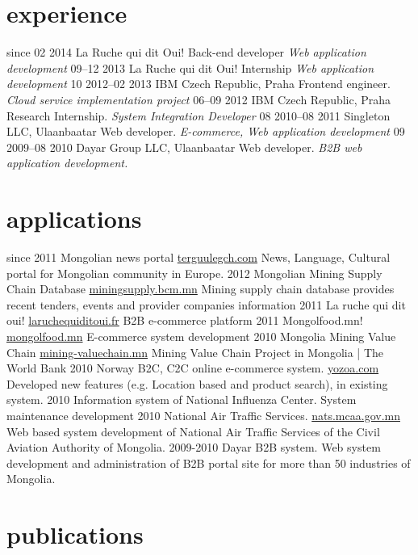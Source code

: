 \documentclass[backend=biber, print]{friggeri-cv}
\begin{document}
\section{experience}

\begin{entrylist}
  \entry
    {since 02 2014}
    {La Ruche qui dit Oui!}
    {Back-end developer}
    {\emph{Web application development}}
  \entry
    {09–12 2013}
    {La Ruche qui dit Oui!}
    {Internship}
    {\emph{Web application development}}
  \entry
    {10 2012–02 2013}
    {IBM Czech Republic, Praha}
    {Frontend engineer.}
    {\emph{Cloud service implementation project}}
  \entry
    {06–09 2012}
    {IBM Czech Republic, Praha}
    {Research Internship.}
    {\emph{System Integration Developer}}
  \entry
    {08 2010–08 2011}
    {Singleton LLC, Ulaanbaatar}
    {Web developer.}
    {\emph{E-commerce, Web application development}}
  \entry
    {09 2009–08 2010}
    {Dayar Group LLC, Ulaanbaatar}
    {Web developer.}
    {\emph{B2B web application development.}}
\end{entrylist}

\section{applications}

\begin{entrylist}
  \entry
    {since 2011}
    {Mongolian news portal}
    {\href{http://terguulegch.com}{terguulegch.com}}
    {News, Language, Cultural portal for Mongolian community in Europe.}
  \entry
    {2012}
    {Mongolian Mining Supply Chain Database}
    {\href{http://miningsupply.bcm.mn}{miningsupply.bcm.mn}}
    {Mining supply chain database provides recent tenders, events and provider companies information }
  \entry
    {2011}
    {La ruche qui dit oui!}
    {\href{http://www.laruchequiditoui.fr}{laruchequiditoui.fr}}
    {B2B e-commerce platform}
  \entry
    {2011}
    {Mongolfood.mn!}
    {\href{http://mongolfood.mn/}{mongolfood.mn}}
    {E-commerce system development}
  \entry
    {2010}
    {Mongolia Mining Value Chain}
    {\href{http://mining-valuechain.eri.mn}{mining-valuechain.mn}}
    {Mining Value Chain Project in Mongolia | The World Bank}
  \entry
    {2010}
    {Norway B2C, C2C online e-commerce system.}
    {\href{http://dev.yozoa.com}{yozoa.com}}
    {Developed new features (e.g. Location based and product search),  in existing system.}
  \entry
    {2010}
    {Information system of National Influenza Center.}
    {}
    {System maintenance development}
  \entry
    {2010}
    {National Air Traffic Services.}
    {\href{http://nats.mcaa.gov.mn/}{nats.mcaa.gov.mn}}
    {Web based system development of National Air Traffic Services of the Civil Aviation Authority of Mongolia.}
  \entry
    {2009-2010}
    {Dayar B2B system.}
    {}
    {Web system development and administration of B2B portal site for more than 50 industries of Mongolia.}
\end{entrylist}

\section{publications}

\begin{refsection}
  \nocite{*}
    \printbibliography[sorting=chronological, type=inproceedings, title={international peer-reviewed conferences/proceedings}, notkeyword={france}, heading=subbibliography]
    \end{refsection}
\end{document}
